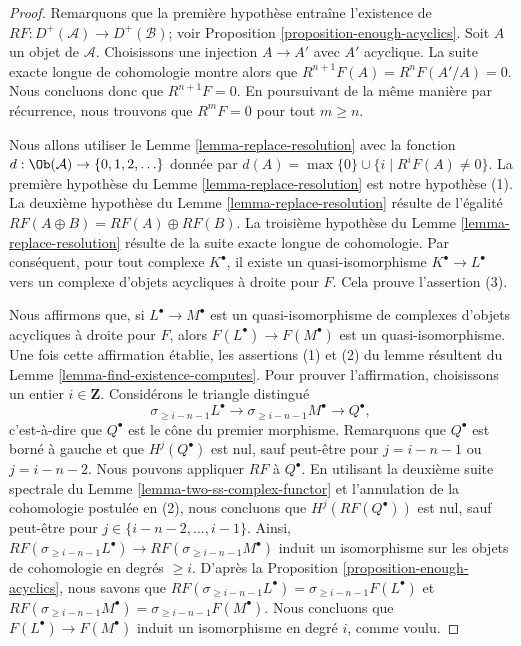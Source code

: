 \begin{proof}
Remarquons que la première hypothèse entraîne l'existence de
$RF : D^+(\mathcal{A}) \to D^+(\mathcal{B})$; voir
Proposition \ref{proposition-enough-acyclics}.
Soit $A$ un objet de $\mathcal{A}$. Choisissons une injection $A \to A'$
avec $A'$ acyclique. La suite exacte longue de cohomologie montre alors que
$R^{n + 1}F(A) = R^nF(A'/A) = 0$. Nous concluons donc que
$R^{n + 1}F = 0$. En poursuivant de la même manière par récurrence, nous
trouvons que $R^mF = 0$ pour tout $m \geq n$.

\medskip\noindent
Nous allons utiliser le Lemme \ref{lemma-replace-resolution} avec la fonction
$d : \Ob(\mathcal{A}) \to \{0, 1, 2, \ldots \}$ donnée par
$d(A) = \max \{0\} \cup \{i \mid R^iF(A) \not = 0\}$.
La première hypothèse du Lemme \ref{lemma-replace-resolution} est notre
hypothèse (1). La deuxième hypothèse du
Lemme \ref{lemma-replace-resolution} résulte de l'égalité
$RF(A \oplus B) = RF(A) \oplus RF(B)$. La troisième hypothèse du
Lemme \ref{lemma-replace-resolution} résulte de la suite exacte longue de
cohomologie. Par conséquent, pour tout complexe $K^\bullet$, il existe un
quasi-isomorphisme $K^\bullet \to L^\bullet$ vers un complexe d'objets
acycliques à droite pour $F$. Cela prouve l'assertion (3).

\medskip\noindent
Nous affirmons que, si $L^\bullet \to M^\bullet$ est un quasi-isomorphisme de
complexes d'objets acycliques à droite pour $F$, alors
$F(L^\bullet) \to F(M^\bullet)$ est un quasi-isomorphisme. Une fois cette
affirmation établie, les assertions (1) et (2) du lemme résultent du
Lemme \ref{lemma-find-existence-computes}.
Pour prouver l'affirmation, choisissons un entier $i \in \mathbf{Z}$.
Considérons le triangle distingué
$$
\sigma_{\geq i - n - 1}L^\bullet \to
\sigma_{\geq i - n - 1}M^\bullet \to Q^\bullet,
$$
c'est-à-dire que $Q^\bullet$ est le cône du premier morphisme.
Remarquons que $Q^\bullet$ est borné à gauche et que $H^j(Q^\bullet)$ est nul,
sauf peut-être pour $j = i - n - 1$ ou $j = i - n - 2$.
Nous pouvons appliquer $RF$ à $Q^\bullet$.
En utilisant la deuxième suite spectrale du
Lemme \ref{lemma-two-ss-complex-functor} et l'annulation de la cohomologie
postulée en (2), nous concluons que $H^j(RF(Q^\bullet))$ est nul, sauf
peut-être pour $j \in \{i - n - 2, \ldots, i - 1\}$. Ainsi,
$RF(\sigma_{\geq i - n - 1}L^\bullet) \to RF(\sigma_{\geq i - n - 1}M^\bullet)$
induit un isomorphisme sur les objets de cohomologie en degrés $\geq i$.
D'après la Proposition \ref{proposition-enough-acyclics}, nous savons que
$RF(\sigma_{\geq i - n - 1}L^\bullet) = \sigma_{\geq i - n - 1}F(L^\bullet)$
et
$RF(\sigma_{\geq i - n - 1}M^\bullet) = \sigma_{\geq i - n - 1}F(M^\bullet)$.
Nous concluons que $F(L^\bullet) \to F(M^\bullet)$ induit un isomorphisme en
degré $i$, comme voulu.


\end{proof}
